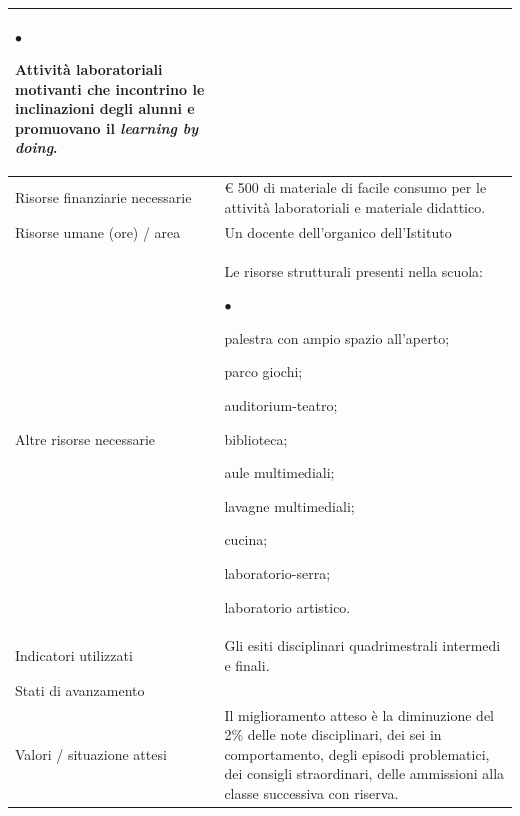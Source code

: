 \documentclass[12pt,a4paper,oneside]{memoir}
\newenvironment{elenco}{\begin{list}{$\bullet$}{%
              \setlength{\leftmargin}{4mm}%
              \setlength{\rightmargin}{1mm}%
               \setlength{\itemindent}{0mm}%
               \setlength{\labelwidth}{2mm}%
               \setlength{\labelsep}{2mm}%
              \setlength{\itemsep}{-\parsep}%
              \setlength{\partopsep}{0pt}%
              \setlength{\topsep}{0pt}%
             \setlength{\parskip}{0pt}%
              }}{\end{list}}
\begin{document}
\begin{footnotesize}
\begin{longtable}{|>{\raggedright}p{2.5cm}|>{\raggedright\arraybackslash}P{10cm}|}
\begin{elenco}
\item Attività laboratoriali motivanti che incontrino le inclinazioni degli alunni e promuovano il \emph{learning by doing}.
\end{elenco}\\[-4mm] \hline
Risorse finanziarie necessarie&€ 500 di materiale di facile consumo per le attività laboratoriali e materiale didattico.\\ \hline
Risorse umane (ore) / area&Un docente dell'organico dell'Istituto\\ \hline
Altre risorse necessarie&Le risorse strutturali presenti nella scuola:
\begin{elenco}
\item palestra con ampio spazio all'aperto;
\item parco giochi;
\item auditorium-teatro;
\item biblioteca;
\item aule multimediali;
\item lavagne multimediali;
\item cucina;
\item laboratorio-serra;
\item laboratorio artistico.
\end{elenco}\\[-4mm] \hline
Indicatori utilizzati &Gli esiti disciplinari quadrimestrali intermedi e finali.\\ \hline
Stati di avanzamento&\\ \hline
Valori / situazione attesi&Il miglioramento atteso è la diminuzione del 2\% delle note disciplinari, dei sei in comportamento, degli episodi problematici, dei consigli straordinari, delle ammissioni alla classe successiva con riserva.\\ \hline
\end{longtable}
\end{footnotesize}

\vspace{24pt}
\end{document}
